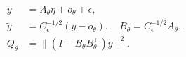 \documentclass{article}
\begin{document}
\fontsize{22}{29}\selectfont
\[
\begin{aligned}y&=A_\theta\eta+o_\theta+\epsilon,\\\widetilde y&=C_\epsilon^{-1/2}(y-o_\theta),\quad B_\theta=C_\epsilon^{-1/2}A_\theta,\\Q_\theta&=\|(I-B_\theta B_\theta^+)\widetilde y\|^2.\end{aligned}
\]
\end{document}
